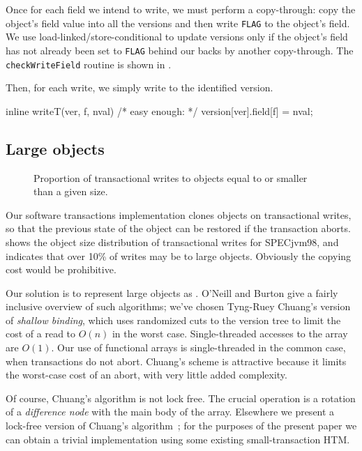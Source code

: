 \documentclass{csa-sig-alternate}
\newenvironment{inlinecode}%
  {\par\linespread{0.9}\footnotesize\samepage%
\verbatim}%
  {\endverbatim}
\newcommand{\FLAG}{\texttt{FLAG}\xspace}
\begin{document}
Once for each field we intend to write, we must perform a
copy-through: copy the object's field value into all the versions and
then write \FLAG to the object's field.  We use
load-linked/store-conditional to update versions only if the object's
field has not already been set to \FLAG behind our backs by another
copy-through.  The {\tt checkWriteField} routine is shown in
.

Then, for each write, we simply write to the identified version.
\begin{inlinecode}
inline writeT(ver, f, nval) {
  /* easy enough: */
  version[ver].field[f] = nval;
}
\end{inlinecode}

\subsection{Large objects}\label{sec:large}
\begin{figure}\centering
{}
\caption{Proportion of transactional writes to objects equal to or
  smaller than a given size.}
\label{fig:tr-w}%
\end{figure}%
Our software transactions implementation clones objects on
transactional writes, so that the previous state of the object can be
restored if the transaction aborts.   shows the object
size distribution of transactional writes for SPECjvm98, and
indicates that over 10\% of writes may be to large objects.
Obviously the copying cost would be prohibitive.

Our solution is to represent large objects as .  O'Neill and Burton \cite{ONeillBu97} give a fairly
inclusive overview of such algorithms; we've chosen Tyng-Ruey Chuang's
version \cite{Chuang94} of \emph{shallow binding}, which uses
randomized cuts to the version tree to limit the cost of a read to
$O(n)$ in the worst case.  Single-threaded accesses to the array are
$O(1)$.  Our use of functional arrays is single-threaded in the common
case, when transactions do not abort.  Chuang's scheme is attractive
because it limits the worst-case cost of an abort, with very little
added complexity.

Of course, Chuang's algorithm is not lock free.
The crucial operation is a rotation of a \emph{difference node} with the
main body of the array.  Elsewhere we present a lock-free version of
Chuang's algorithm~\cite{Ananian05}; for the purposes of the present paper we
can obtain a trivial implementation using some
existing small-transaction HTM.
\end{document}
